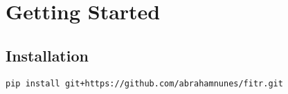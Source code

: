 \section{Getting Started}\label{getting-started}

\subsection{Installation}\label{installation}

\begin{verbatim}
pip install git+https://github.com/abrahamnunes/fitr.git
\end{verbatim}
